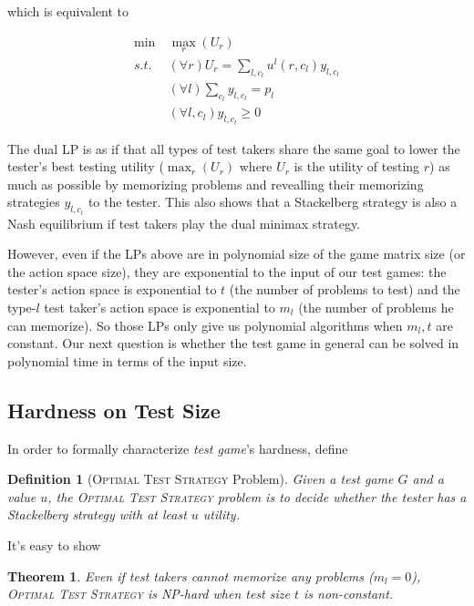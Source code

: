 \documentclass{article}
\newtheorem{theorem}{Theorem}
\newtheorem{definition}{Definition}
\begin{document}
which is equivalent to 

\begin{align}\label{eqn:minimax}
  \min~&\max_r(U_r)\\
  s.t. &(\forall r) U_r = \sum_{l, c_l} u^l(r, c_l) y_{l, c_l}\nonumber\\
  &(\forall l) \sum_{c_l} y_{l, c_l} = p_l\nonumber\\
  &(\forall l, c_l) y_{l, c_l} \geq 0\nonumber
\end{align}

The dual LP is as if that all types of test takers share the same goal to lower
the tester's best testing utility ($\max_r (U_r)$ where $U_r$ is the utility of
testing $r$) as much as possible by memorizing problems and revealling their
memorizing strategies $y_{l, c_l}$ to the tester. This also shows that a
Stackelberg strategy is also a Nash equilibrium if test takers play the dual
minimax strategy.

However, even if the LPs above are in polynomial size of the game matrix size
(or the action space size), they are exponential to the input of our test
games: the tester's action space is exponential to $t$ (the number of problems
to test) and the type-$l$ test taker's action space is exponential to $m_l$
(the number of problems he can memorize). So those LPs only give us polynomial
algorithms when $m_l, t$ are constant. Our next question is whether the test
game in general can be solved in polynomial time in terms of the input size.

\subsection{Hardness on Test Size}

In order to formally characterize \emph{test game}'s hardness, define

\begin{definition}[\textsc{Optimal Test Strategy} Problem]
Given a test game $G$ and a value $u$, the \textsc{Optimal Test Strategy}
problem is to decide whether the tester has a Stackelberg strategy with at
least $u$ utility.
\end{definition}

It's easy to show

\begin{theorem}\label{thm:test-hardness}
Even if test takers cannot memorize any problems ($m_l = 0$), \textsc{Optimal
Test Strategy} is NP-hard when test size $t$ is non-constant.
\end{theorem}
\end{document}
